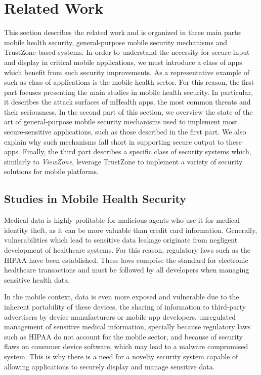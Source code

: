 
% 
% 
\section{Related Work}
\label{sec:relatedWork}

This section describes the related work and is organized in three main parts: mobile health security, general-purpose mobile security mechanisms and TrustZone-based systems.
In order to understand the necessity for secure input and display in critical mobile applications, we must introduce a class of apps which benefit from such security improvements. As a representative example of such as class of applications is the mobile health sector. For this reason, the first part focuses presenting the main studies in mobile health security. In particular, it describes the attack surfaces of mHealth apps, the most common threats and their seriousness.
In the second part of this section, we overview the state of the art of general-purpose mobile security mechanisms used to implement most secure-sensitive applications, such as those described in the first part. We also explain why such mechanisms fall short in supporting secure output to these apps.%
Finally, the third part describes a specific class of security systems which, similarly to \emph{ViewZone}, leverage TrustZone to implement a variety of security solutions for mobile platforms.

\subsection{Studies in Mobile Health Security}
\label{sec:mhealth}

Medical data is highly profitable for malicious agents who use it for medical identity theft, as it can be more valuable than credit card information. Generally, vulnerabilities which lead to sensitive data leakage originate from negligent development of healthcare systems. For this reason, regulatory laws such as the \ac{HIPAA} have been established. These laws comprise the standard for electronic healthcare transactions and must be followed by all developers when managing sensitive health data.

In the mobile context, data is even more exposed and vulnerable due to the inherent portability of these devices, the sharing of information to third-party advertisers by device manufacturers or mobile app developers, unregulated management of sensitive medical information, specially because regulatory laws such as \ac{HIPAA} do not account for the mobile sector, and because of security flaws on consumer device software, which may lead to a malware compromised system. This is why there is a need for a novelty security system capable of allowing applications to securely display and manage sensitive data.

